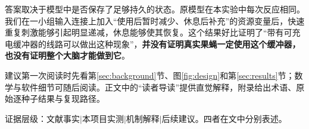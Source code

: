 \documentclass[UTF8,a4paper,zihao=-4,fontset=none]{ctexart}
\begin{document}
答案取决于模型中是否保存了足够持久的状态。原模型在本实验中每次反应相同。我们在一小组输入连接上加入“使用后暂时减少、休息后补充”的资源变量后，快速重复刺激能够引起明显递减，休息能够使其恢复。这个结果好比证明了“带有可充电缓冲器的线路可以做出这种现象”，\textbf{并没有证明真实果蝇一定使用这个缓冲器，也没有证明整个大脑才能做到它}。

建议第一次阅读时先看第\ref{sec:background}节、图\ref{fig:design}和第\ref{sec:results}节；数学与软件细节可随后阅读。正文中的“读者导读”提供直觉解释，附录给出术语、原始逐种子结果与复现路径。

\vspace{0.4em}
\begin{center}\small\color{Gray}
证据层级：文献事实\quad$\vert$\quad 本项目实测\quad$\vert$\quad 机制解释\quad$\vert$\quad 后续建议。四者在文中分别表述。
\end{center}
\clearpage
\tableofcontents
\clearpage




\FloatBarrier


\clearpage
\appendix

\end{document}
